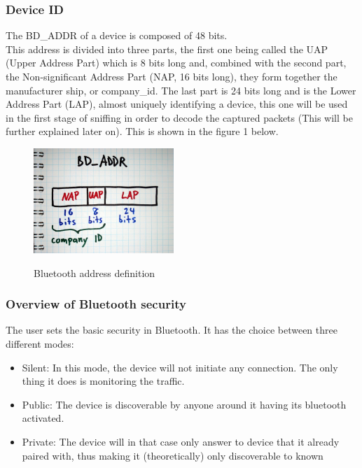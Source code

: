 \subsubsection{Device ID}

The BD\_ADDR of a device is composed of 48 bits. \\
This address is divided into three parts, the first one being called the UAP (Upper Address Part) which is 8 bits long and, combined with the second part, the Non-significant Address Part (NAP, 16 bits long), they form together the manufacturer ship, or company\_id. The last part is 24 bits long and is the Lower Address Part (LAP), almost uniquely identifying a device, this one will be used in the first stage of sniffing in order to decode the captured packets (This will be further explained later on). This is shown in the figure 1 below.

\begin{figure}[!h]
  \begin{center}
	\includegraphics[width=200px]{images/bd_addr.jpg}
	\label{Bluetooth address}
	\caption{Bluetooth address definition}
  \end{center}
\end{figure}
\newpage
\subsubsection{Overview of Bluetooth security}

The user sets the basic security in Bluetooth. It has the choice between three different modes:
 \begin{itemize}[noitemsep,nolistsep]
 	\item Silent: In this mode, the device will not initiate any connection. The only thing it does is monitoring the traffic.
 	\item Public: The device is discoverable by anyone around it having its bluetooth activated.
 	\item Private: The device will in that case only answer to device that it already paired with, thus making it (theoretically) only discoverable to known 
 \end{itemize}

